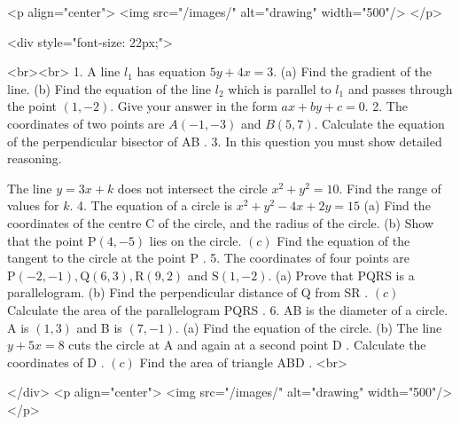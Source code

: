 <p align="center">
<img src="/images/" alt="drawing" width="500"/>
</p>

<div style="font-size: 22px;">

<br><br>
1. A line $l_{1}$ has equation $5 y+4 x=3$.
(a) Find the gradient of the line.
(b) Find the equation of the line $l_{2}$ which is parallel to $l_{1}$ and passes through the point $(1,-2)$. Give your answer in the form $a x+b y+c=0$.
2. The coordinates of two points are $A(-1,-3)$ and $B(5,7)$. Calculate the equation of the perpendicular bisector of AB .
3. In this question you must show detailed reasoning.

The line $y=3 x+k$ does not intersect the circle $x^{2}+y^{2}=10$.
Find the range of values for $k$.
4. The equation of a circle is $x^{2}+y^{2}-4 x+2 y=15$
(a) Find the coordinates of the centre C of the circle, and the radius of the circle.
(b) Show that the point $\mathrm{P}(4,-5)$ lies on the circle.
\((c)\) Find the equation of the tangent to the circle at the point P .
5. The coordinates of four points are $\mathrm{P}(-2,-1), \mathrm{Q}(6,3), \mathrm{R}(9,2)$ and $\mathrm{S}(1,-2)$.
(a) Prove that PQRS is a parallelogram.
(b) Find the perpendicular distance of Q from SR .
\((c)\) Calculate the area of the parallelogram PQRS .
6. AB is the diameter of a circle. A is $(1,3)$ and B is $(7,-1)$.
(a) Find the equation of the circle.
(b) The line $y+5 x=8$ cuts the circle at A and again at a second point D . Calculate the coordinates of D .
\((c)\) Find the area of triangle ABD .
<br>

</div>
<p align="center">
<img src="/images/" alt="drawing" width="500"/>
</p>
